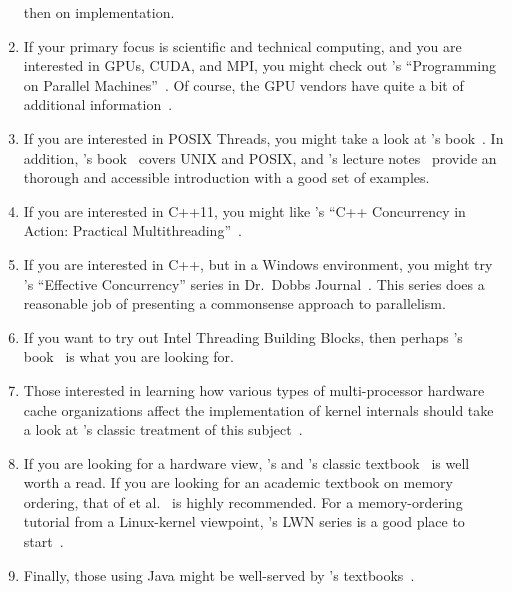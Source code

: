\begin{enumerate}
	then on implementation.
\item	If your primary focus is scientific and technical computing,
	and you are interested in GPUs, CUDA, and MPI, you
	might check out 's ``Programming on
	Parallel Machines''~\cite{NormMatloff2017ParProcBook}.
	Of course, the GPU vendors have quite a bit of additional
	information~\cite{AMD2020ROCm,CyrilZeller2011GPGPUbasics,NVidia2017GPGPU,NVidia2017GPGPU-university}.
\item	If you are interested in POSIX Threads, you might take
	a look at 's book~\cite{Butenhof1997pthreads}.
	In addition,
	's book~\cite{WRichardStevens1992,WRichardStevens2013}
	covers UNIX and POSIX, and 's lecture
	notes~\cite{StewartWeiss2013UNIX} provide an
	thorough and accessible introduction with a good set of
	examples.
\item	If you are interested in C++11, you might like
	's ``C++ Concurrency in Action: Practical
	Multithreading''~\cite{AnthonyWilliams2012,AnthonyWilliams2019}.
\item	If you are interested in C++, but in a Windows environment,
	you might try 's ``Effective Concurrency''
	series in
	Dr.~Dobbs Journal~\cite{HerbSutter2008EffectiveConcurrency}.
	This series does a reasonable job of presenting a
	commonsense approach to parallelism.
\item	If you want to try out Intel Threading Building Blocks,
	then perhaps 's book~\cite{Reinders2007Textbook}
	is what you are looking for.
\item	Those interested in learning how various types of multi-processor
	hardware
	cache organizations affect the implementation of kernel
	internals should take a look at 's classic
	treatment of this subject~\cite{Schimmel:1994:USM:175689}.
\item	If you are looking for a hardware view, 's and
	's classic
	textbook~\cite{Hennessy2017,Hennessy2011} is well worth a read.
	If you are looking for an academic textbook on memory ordering,
	that of  et al.~\cite{DanielJSorin2011MemModel,%
	VijayNagarajan2020MemModel}
	is highly recommended.
	For a memory-ordering tutorial from a Linux-kernel viewpoint,
	's LWN series is a good place to
	start~\cite{PaoloBonzini2021lockless1,PaoloBonzini2021lockless2,PaoloBonzini2021lockless3,PaoloBonzini2021lockless4,PaoloBonzini2021lockless5,PaoloBonzini2021lockless6}.
\item	Finally, those using Java might be well-served by 's
	textbooks~\cite{DougLea1997Textbook,Goetz2007Textbook}.
\end{enumerate}

